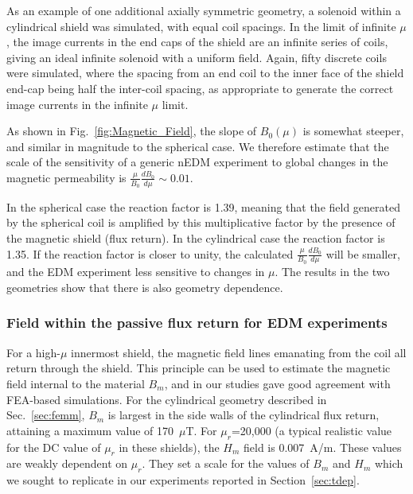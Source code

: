 As an example of one additional axially symmetric geometry, a solenoid
within a cylindrical shield was simulated, with equal coil spacings.
In the limit of infinite $\mu$, the image currents in the end caps of
the shield are an infinite series of coils, giving an ideal infinite
solenoid with a uniform field.  Again, fifty discrete coils were
simulated, where the spacing from an end coil to the inner face of the
shield end-cap being half the inter-coil spacing, as appropriate to
generate the correct image currents in the infinite $\mu$ limit. 

As shown in Fig.~\ref{fig:Magnetic_Field}, the slope of $B_0(\mu)$ is
somewhat steeper, and similar in magnitude to the spherical case.  We
therefore estimate that the scale of the sensitivity of a generic nEDM
experiment to global changes in the magnetic permeability is
$\frac{\mu}{B_0}\frac{dB_0}{d\mu}\sim 0.01$.

In the spherical case the reaction factor is 1.39, meaning that the
field generated by the spherical coil is amplified by this
multiplicative factor by the presence of the magnetic shield (flux
return).  In the cylindrical case the reaction factor is 1.35.  If the
reaction factor is closer to unity, the calculated
$\frac{\mu}{B_0}\frac{dB_0}{d\mu}$ will be smaller, and the EDM
experiment less sensitive to changes in $\mu$.  The results in the two
geometries show that there is also geometry dependence.


\subsubsection{Field within the passive flux return for EDM experiments}

For a high-$\mu$ innermost shield, the magnetic field lines emanating
from the coil all return through the shield.  This principle can be
used to estimate the magnetic field internal to the material $B_m$,
and in our studies gave good agreement with FEA-based simulations.
For the cylindrical geometry described in Sec.~\ref{sec:femm}, $B_m$
is largest in the side walls of the cylindrical flux return, attaining
a maximum value of 170~$\mu$T.  For $\mu_r$=20,000 (a typical
realistic value for the DC value of $\mu_r$ in these shields), the
$H_m$ field is 0.007~A/m.  These values are weakly dependent on
$\mu_r$.  They set a scale for the values of $B_m$ and $H_m$ which we
sought to replicate in our experiments reported in
Section~\ref{sec:tdep}.




